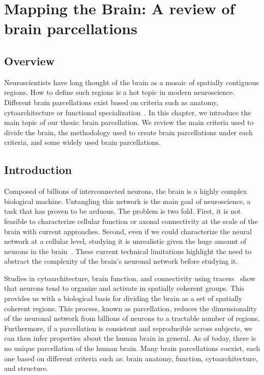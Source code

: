 \chapter{Mapping the Brain: A review of brain parcellations}
\label{ch:brain_mapping}

\section{Overview}
Neuroscientists have long thought of the brain as a mosaic of spatially contiguous
regions. How to define such regions is a hot topic in modern neuroscience.
Different brain parcellations exist based on criteria such as anatomy,
cytoarchitecture or functional specialization~\cite{Brodmann1909, Collins1998, Yeo2011}.
In this chapter, we introduce the main topic of our thesis: brain
parcellation. We review the main criteria used to divide the brain, the methodology
used to create brain parcellations under each criteria, and some widely used
brain parcellations.

\section{Introduction}
Composed of billions of interconnected neurons, the brain is a highly complex
biological machine. Untangling this network is the main goal of
neuroscience, a task that has proven to be arduous. The problem is two fold.
First, it is not feasible to characterize cellular function or axonal
connectivity at the scale of the brain with current approaches. Second, even if
we could characterize the neural network at a cellular level, studying it is
unrealistic given the huge amount of neurons in the brain~\cite{Gong2009}.
These current technical
limitations highlight the need to abstract the complexity of the brain's neuronal
network before studying it.

Studies in cytoarchitecture\cite{Meynert1872, Brodmann1909, VonEconomo1925}, brain
function\cite{Penfield1954, VonderMalsburg1994}, and connectivity using tracers~\cite{Schmahmann2006, Stephan2013}
show that neurons tend to organize and activate in spatially coherent groups.
This provides us with a biological basis for dividing the brain as a set of spatially
coherent regions. This process, known as parcellation, reduces the dimensionality
of the neuronal network from billions of neurons to a tractable number of regions.
Furthermore, if a parcellation is consistent and reproducible across subjects,
we can then infer properties about the human brain in general. As of today,
there is no unique parcellation of the human brain. Many brain parcellations
coexist, each one based on different criteria such as: brain anatomy, 
function, cytoarchitecture, and structure. 

